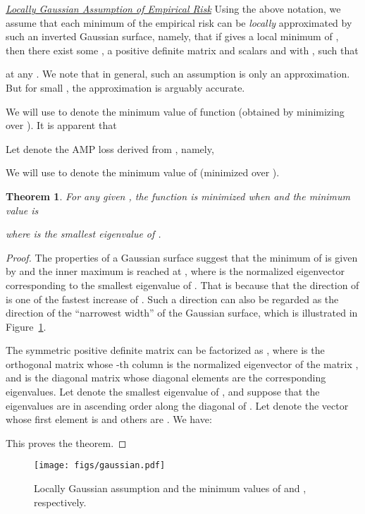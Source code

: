 \documentclass[final]{cvpr}
\newtheorem{theorem}{Theorem}
\begin{document}
\noindent\underline{\em Locally Gaussian Assumption of Empirical Risk} Using the above notation, we assume that each minimum of the empirical risk can be {\em locally} approximated by such an inverted Gaussian surface, namely, that 
if  gives a local minimum of , then there exist some , a positive definite matrix  and scalars  and  with , such that

at any .
We note that in general, such an assumption is only an approximation. But for small , the approximation is arguably accurate. 

We will use  to denote the minimum value of function  (obtained by minimizing over ). It is apparent that 


Let  denote the AMP loss derived from , namely,


We will use  to denote the minimum value of  (minimized over ). 

\begin{theorem}
For any given , the function  is minimized when  and the minimum value is

where  is the smallest eigenvalue of .
\end{theorem}

\begin{proof}
The properties of a Gaussian surface suggest that the minimum of  is given by  and the inner maximum is reached at , where  is the normalized eigenvector corresponding to the smallest eigenvalue of . That is because that the direction of  is one of the fastest increase of . Such a direction can also be regarded as the direction of the ``narrowest width'' of the Gaussian surface, which is illustrated in Figure~\ref{fig:gaussian}.

The symmetric positive definite matrix  can be factorized as , where  is the  orthogonal matrix whose -th column is the normalized eigenvector  of the matrix , and  is the diagonal matrix whose diagonal elements are the corresponding eigenvalues. Let  denote the smallest eigenvalue of , and suppose that the eigenvalues are in ascending order along the diagonal of . Let  denote the vector  whose first element is  and others are . We have:


This proves the theorem.
\end{proof}

\begin{figure}[t]
\centering
\texttt{[image: figs/gaussian.pdf]}\caption{Locally Gaussian assumption and the minimum values of  and , respectively.}
\label{fig:gaussian}
\end{figure}
\end{document}
